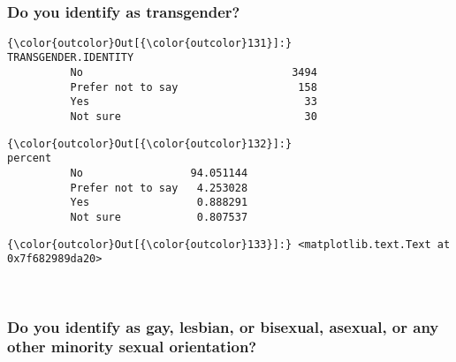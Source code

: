 \documentclass[11pt]{article}
\begin{document}
    \begin{center}
    \end{center}
    { \hspace*{\fill} \\}
    
    \subsubsection{Do you identify as
transgender?}\label{do-you-identify-as-transgender}


            \begin{Verbatim}[commandchars=\\\{\}]
{\color{outcolor}Out[{\color{outcolor}131}]:}                    TRANSGENDER.IDENTITY
          No                                 3494
          Prefer not to say                   158
          Yes                                  33
          Not sure                             30
\end{Verbatim}
        

            \begin{Verbatim}[commandchars=\\\{\}]
{\color{outcolor}Out[{\color{outcolor}132}]:}                      percent
          No                 94.051144
          Prefer not to say   4.253028
          Yes                 0.888291
          Not sure            0.807537
\end{Verbatim}
        

            \begin{Verbatim}[commandchars=\\\{\}]
{\color{outcolor}Out[{\color{outcolor}133}]:} <matplotlib.text.Text at 0x7f682989da20>
\end{Verbatim}
        
    \begin{center}
    \end{center}
    { \hspace*{\fill} \\}
    

    \subsubsection{Do you identify as gay, lesbian, or bisexual, asexual, or
any other minority sexual
orientation?}\label{do-you-identify-as-gay-lesbian-or-bisexual-asexual-or-any-other-minority-sexual-orientation}
\end{document}
